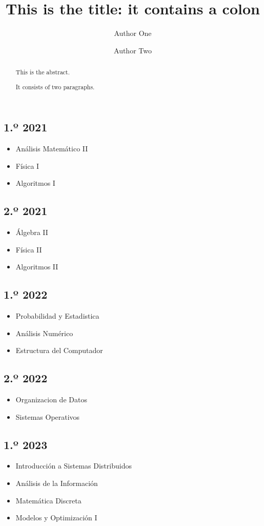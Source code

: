 \documentclass[
]{article}
\title{This is the title: it contains a colon}
\author{Author One \and Author Two}
\date{}
\providecommand{\tightlist}{%
  \setlength{\itemsep}{0pt}\setlength{\parskip}{0pt}}
\begin{document}
\maketitle
\begin{abstract}
This is the abstract.

It consists of two paragraphs.
\end{abstract}

\hypertarget{uxba-2021}{%
\subsection{1.º 2021}\label{uxba-2021}}

\begin{itemize}
\tightlist
\item
  Análisis Matemático II
\item
  Física I
\item
  Algoritmos I
\end{itemize}

\hypertarget{uxba-2021-1}{%
\subsection{2.º 2021}\label{uxba-2021-1}}

\begin{itemize}
\tightlist
\item
  Álgebra II
\item
  Física II
\item
  Algoritmos II
\end{itemize}

\hypertarget{uxba-2022}{%
\subsection{1.º 2022}\label{uxba-2022}}

\begin{itemize}
\tightlist
\item
  Probabilidad y Estadistica
\item
  Análisis Numérico
\item
  Estructura del Computador
\end{itemize}

\hypertarget{uxba-2022-1}{%
\subsection{2.º 2022}\label{uxba-2022-1}}

\begin{itemize}
\tightlist
\item
  Organizacion de Datos
\item
  Sistemas Operativos
\end{itemize}

\hypertarget{uxba-2023}{%
\subsection{1.º 2023}\label{uxba-2023}}

\begin{itemize}
\tightlist
\item
  Introducción a Sistemas Distribuidos
\item
  Análisis de la Información
\item
  Matemática Discreta
\item
  Modelos y Optimización I
\end{itemize}
\end{document}

